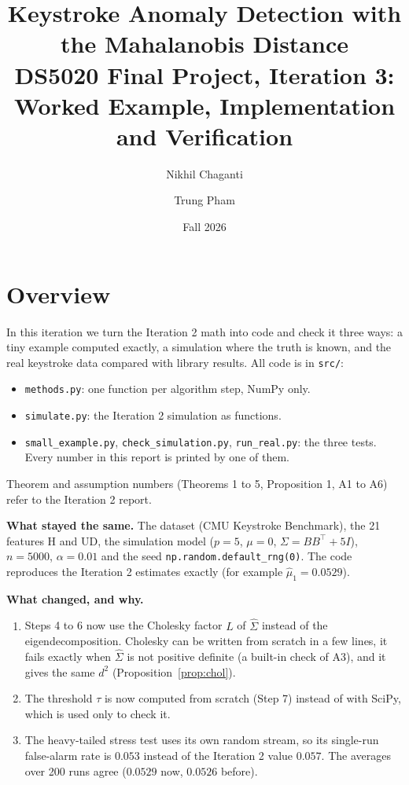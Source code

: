 \documentclass[11pt]{article}
\title{\textbf{Keystroke Anomaly Detection with the Mahalanobis Distance}\\[4pt]
\large DS5020 Final Project, Iteration 3: Worked Example, Implementation and Verification}
\author{Nikhil Chaganti \and Trung Pham}
\date{Fall 2026}
\newcommand{\T}{^{\top}}
\newcommand{\hSigma}{\hat{\Sigma}}
\newcommand{\hmu}{\hat{\mu}}
\newcommand{\code}[1]{\texttt{#1}}
\theoremstyle{plain}
\begin{document}
\maketitle
\tableofcontents

\section{Overview}
In this iteration we turn the Iteration 2 math into code and check it three ways:
a tiny example computed exactly, a simulation where the truth is known, and the
real keystroke data compared with library results. All code is in \code{src/}:

\begin{itemize}[nosep]
\item \code{methods.py}: one function per algorithm step, NumPy only.
\item \code{simulate.py}: the Iteration 2 simulation as functions.
\item \code{small\_example.py}, \code{check\_simulation.py}, \code{run\_real.py}:
  the three tests. Every number in this report is printed by one of them.
\end{itemize}

Theorem and assumption numbers (Theorems 1 to 5, Proposition 1, A1 to A6) refer to the
Iteration 2 report.

\textbf{What stayed the same.} The dataset (CMU Keystroke Benchmark), the 21
features H and UD, the simulation model ($p=5$, $\mu=0$, $\Sigma=BB\T+5I$),
$n=5000$, $\alpha=0.01$ and the seed \code{np.random.default\_rng(0)}. The code
reproduces the Iteration 2 estimates exactly (for example $\hmu_1=0.0529$).

\textbf{What changed, and why.}
\begin{enumerate}[nosep]
\item Steps 4 to 6 now use the Cholesky factor $L$ of $\hSigma$ instead of the
  eigendecomposition. Cholesky can be written from scratch in a few lines, it fails
  exactly when $\hSigma$ is not positive definite (a built-in check of A3), and it
  gives the same $d^2$ (Proposition~\ref{prop:chol}).
\item The threshold $\tau$ is now computed from scratch (Step 7) instead of with
  SciPy, which is used only to check it.
\item The heavy-tailed stress test uses its own random stream, so its single-run
  false-alarm rate is $0.053$ instead of the Iteration 2 value $0.057$. The averages
  over 200 runs agree ($0.0529$ now, $0.0526$ before).
\end{enumerate}
\end{document}
